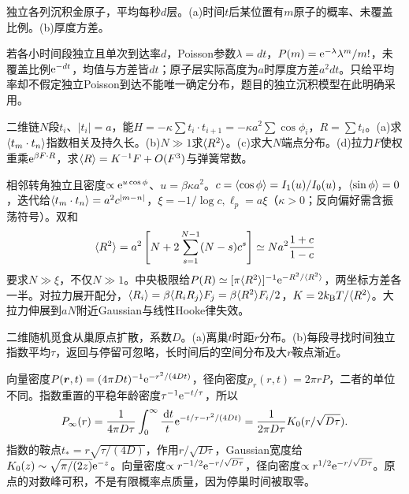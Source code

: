 \begin{exercise}[原题1(a)--(b)]\label{p:333-2-1}
独立各列沉积金原子，平均每秒$d$层。(a)时间$t$后某位置有$m$原子的概率、未覆盖比例。(b)厚度方差。
\end{exercise}
\begin{solution}
若各小时间段独立且单次到达率$d$，Poisson参数$\lambda=dt$，$P(m)=\mathrm e^{-\lambda}\lambda^m/m!$，未覆盖比例$\mathrm e^{-dt}$，均值与方差皆$dt$；原子层实际高度为$a$时厚度方差$a^2dt$。只给平均率却不假定独立Poisson到达不能唯一确定分布，题目的独立沉积模型在此明确采用。
\end{solution}
\begin{exercise}[原题2(a)--(d)]\label{p:333-2-2}
二维链$N$段$t_i$、$|t_i|=a$，能$H=-\kappa\sum t_i\cdot t_{i+1}=-\kappa a^2\sum\cos\phi_i$，$R=\sum t_i$。(a)求$\langle t_m\cdot t_n\rangle$指数相关及持久长。(b)$N\gg1$求$\langle R^2\rangle$。(c)求大$N$端点分布。(d)拉力$F$使权重乘$\mathrm e^{\beta F\cdot R}$，求$\langle R\rangle=K^{-1}F+O(F^3)$与弹簧常数。
\end{exercise}
\begin{solution}
相邻转角独立且密度$\propto\mathrm e^{u\cos\phi}$、$u=\beta\kappa a^2$。$c=\langle \cos\phi\rangle=I_1(u)/I_0(u)$，$\langle \sin\phi\rangle=0$，迭代给$\langle t_m\cdot t_n\rangle=a^2c^{|m-n|}$，$\xi=-1/\log c,\ell_p=a\xi$（$\kappa>0$；反向偏好需含振荡符号）。双和
\begin{equation}
\langle R^2\rangle=a^2\left[N+2\sum_{s=1}^{N-1}(N-s)c^s\right]\simeq Na^2\frac{1+c}{1-c}
\end{equation}
要求$N\gg\xi$，不仅$N\gg1$。中央极限给$P(R)\simeq[\pi\langle R^2\rangle]^{-1}\mathrm e^{-R^2/\langle R^2\rangle}$，两坐标方差各一半。对拉力展开配分，$\langle R_i\rangle=\beta\langle R_iR_j\rangle F_j=\beta\langle R^2\rangle F_i/2$，$K=2k_{\mathrm B} T/\langle R^2\rangle$。大拉力伸展到$aN$附近Gaussian与线性Hooke律失效。
\end{solution}
\begin{exercise}[原题3(a)--(b)]\label{p:333-2-3}
二维随机觅食从巢原点扩散，系数$D$。(a)离巢$t$时距$r$分布。(b)每段寻找时间独立指数平均$\tau$，返回与停留可忽略，长时间后的空间分布及大$r$鞍点渐近。
\end{exercise}
\begin{solution}
向量密度$P(\boldsymbol{r},t)=(4\pi Dt)^{-1}\mathrm e^{-r^2/(4Dt)}$，径向密度$p_r(r,t)=2\pi rP$，二者的单位不同。指数重置的平稳年龄密度$\tau^{-1}\mathrm e^{-t/\tau}$，所以
\begin{equation}
P_\infty(r)=\frac1{4\pi D\tau}\int_0^\infty\frac{\,\mathrm d t}{t}\mathrm e^{-t/\tau-r^2/(4Dt)}=\frac1{2\pi D\tau}K_0(r/\sqrt{D\tau}).
\end{equation}
指数的鞍点$t_*=r\sqrt{\tau/(4D)}$，作用$r/\sqrt{D\tau}$，Gaussian宽度给$K_0(z)\sim\sqrt{\pi/(2z)}\mathrm e^{-z}$。向量密度$\propto r^{-1/2}\mathrm e^{-r/\sqrt{D\tau}}$，径向密度$\propto r^{1/2}\mathrm e^{-r/\sqrt{D\tau}}$。原点的对数峰可积，不是有限概率点质量，因为停巢时间被取零。
\end{solution}
